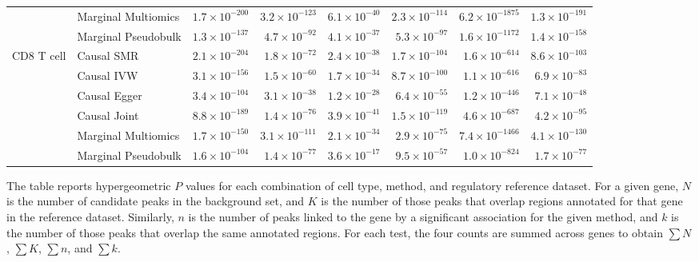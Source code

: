 \begin{table}[htbp]
\begin{tabular}{@{}llrrrrrr@{}}
 & Marginal Multiomics & \(1.7\times10^{-200}\) & \(3.2\times10^{-123}\) & \(6.1\times10^{-40}\) & \(2.3\times10^{-114}\) & \(6.2\times10^{-1875}\) & \(1.3\times10^{-191}\) \\
 & Marginal Pseudobulk & \(1.3\times10^{-137}\) & \(4.7\times10^{-92}\) & \(4.1\times10^{-37}\) & \(5.3\times10^{-97}\) & \(1.6\times10^{-1172}\) & \(1.4\times10^{-158}\) \\
\midrule
CD8 T cell & Causal SMR & \(2.1\times10^{-204}\) & \(1.8\times10^{-72}\) & \(2.4\times10^{-38}\) & \(1.7\times10^{-104}\) & \(1.6\times10^{-614}\) & \(8.6\times10^{-103}\) \\
 & Causal IVW & \(3.1\times10^{-156}\) & \(1.5\times10^{-60}\) & \(1.7\times10^{-34}\) & \(8.7\times10^{-100}\) & \(1.1\times10^{-616}\) & \(6.9\times10^{-83}\) \\
 & Causal Egger & \(3.4\times10^{-104}\) & \(3.1\times10^{-38}\) & \(1.2\times10^{-28}\) & \(6.4\times10^{-55}\) & \(1.2\times10^{-446}\) & \(7.1\times10^{-48}\) \\
 & Causal Joint & \(8.8\times10^{-189}\) & \(1.4\times10^{-76}\) & \(3.9\times10^{-41}\) & \(1.5\times10^{-119}\) & \(4.6\times10^{-687}\) & \(4.2\times10^{-95}\) \\
 & Marginal Multiomics & \(1.7\times10^{-150}\) & \(3.1\times10^{-111}\) & \(2.1\times10^{-34}\) & \(2.9\times10^{-75}\) & \(7.4\times10^{-1466}\) & \(4.1\times10^{-130}\) \\
 & Marginal Pseudobulk & \(1.6\times10^{-104}\) & \(1.4\times10^{-77}\) & \(3.6\times10^{-17}\) & \(9.5\times10^{-57}\) & \(1.0\times10^{-824}\) & \(1.7\times10^{-77}\) \\
\bottomrule
\end{tabular}
\par\medskip
\begin{minipage}{\linewidth}
\footnotesize
The table reports hypergeometric \(P\) values for each combination
of cell type, method, and regulatory reference dataset. For a given gene,
\(N\) is the number of candidate peaks in the background set, and \(K\)
is the number of those peaks that overlap regions annotated for that gene
in the reference dataset. Similarly, \(n\) is the number of peaks linked
to the gene by a significant association for the given method, and \(k\)
is the number of those peaks that overlap the same annotated regions.
For each test, the four counts are summed across genes to obtain
\(\sum N\), \(\sum K\), \(\sum n\), and \(\sum k\).
\end{minipage}
\endgroup
\end{table}
